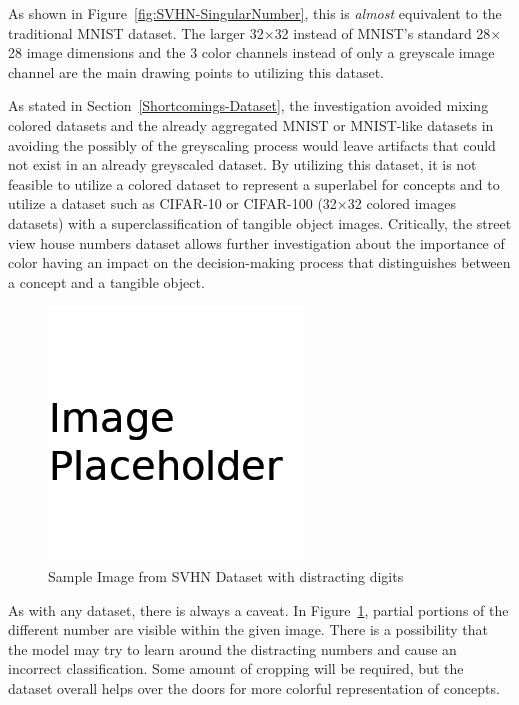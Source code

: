 \documentclass[conference]{IEEEtran}
\begin{document}
As shown in Figure~\ref{fig:SVHN-SingularNumber}, this is \textit{almost}
equivalent to the traditional MNIST dataset. The larger 32$\times$32 instead of
MNIST's standard 28$\times$28 image dimensions and the 3 color channels instead
of only a greyscale image channel are the main drawing points to utilizing this
dataset.

As stated in Section~\ref{Shortcomings-Dataset}, the investigation avoided
mixing colored datasets and the already aggregated MNIST or MNIST-like datasets
in avoiding the possibly of the greyscaling process would leave artifacts that
could not exist in an already greyscaled dataset. By utilizing this dataset, it
is not feasible to utilize a colored dataset to represent a superlabel for
concepts and to utilize a dataset such as CIFAR-10 or CIFAR-100 (32$\times$32 colored
images datasets) with a superclassification of tangible object images.
Critically, the street view house numbers dataset allows further investigation
about the importance of color having an impact on the decision-making process
that distinguishes between a concept and a tangible object.


\begin{figure}[H]
  \centering
  \includegraphics[width=0.8\linewidth]{figures/placeholder.png}
  \caption{Sample Image from SVHN Dataset with distracting digits~\cite{stree_view_house_numbers_dataset}}%
  \label{fig:SVHN-ImageWithDistractingDigits}
\end{figure}


As with any dataset, there is always a caveat. In
Figure~\ref{fig:SVHN-ImageWithDistractingDigits}, partial portions of the
different number are visible within the given image. There is a possibility that
the model may try to learn around the distracting numbers and cause an incorrect
classification. Some amount of cropping will be required, but the dataset
overall helps over the doors for more colorful representation of concepts.
\end{document}

